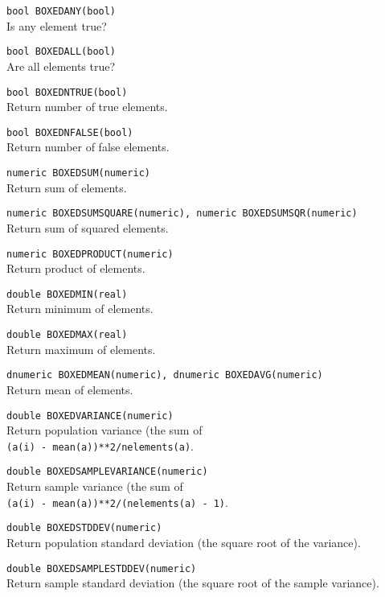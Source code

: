 \begin{description}
  \item[] \texttt{bool BOXEDANY(bool)}\\
    Is any element true?
  \item[] \texttt{bool BOXEDALL(bool)}\\
    Are all elements true?
  \item[] \texttt{bool BOXEDNTRUE(bool)}\\
    Return number of true elements.
  \item[] \texttt{bool BOXEDNFALSE(bool)}\\
    Return number of false elements.
  \item[] \texttt{numeric BOXEDSUM(numeric)}\\
    Return sum of elements.
  \item[] \texttt{numeric BOXEDSUMSQUARE(numeric), numeric BOXEDSUMSQR(numeric)}\\
    Return sum of squared elements.
  \item[] \texttt{numeric BOXEDPRODUCT(numeric)}\\
    Return product of elements.
  \item[] \texttt{double BOXEDMIN(real)}\\
    Return minimum of elements.
  \item[] \texttt{double BOXEDMAX(real)}\\
    Return maximum of elements.
  \item[] \texttt{dnumeric BOXEDMEAN(numeric), dnumeric BOXEDAVG(numeric)}\\
    Return mean of elements.
  \item[] \texttt{double BOXEDVARIANCE(numeric)}\\
    Return population variance (the sum of
    \\\texttt{(a(i) - mean(a))**2/nelements(a)}.
  \item[] \texttt{double BOXEDSAMPLEVARIANCE(numeric)}\\
    Return sample variance (the sum of
    \\\texttt{(a(i) - mean(a))**2/(nelements(a) - 1)}.
  \item[] \texttt{double BOXEDSTDDEV(numeric)}\\
    Return population standard deviation (the square root of the variance).
  \item[] \texttt{double BOXEDSAMPLESTDDEV(numeric)}\\
    Return sample standard deviation (the square root of the sample variance).

\end{description}
